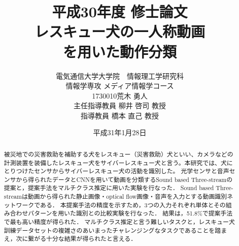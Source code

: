 \documentclass[a4j,12pt]{jreport}
\title{
	平成30年度 修士論文\vspace{1cm}\\
	\huge  レスキュー犬の一人称動画\\を用いた動作分類\vspace{6cm}
}
\author{
	電気通信大学大学院　情報理工学研究科\\
	情報学専攻 メディア情報学コース\\
	1730010\hspace{1cm}荒木 勇人\\
	主任指導教員 柳井 啓司 教授\\
        指導教員 橋本 直己 教授
}
\date{
平成31年1月28日
}
\begin{document}
\maketitle
\thispagestyle{empty}
\pagebreak

\begin{abstract}

被災地での災害救助を補助する犬をレスキュー（災害救助）犬といい、カメラなどの計測装置を装備したレスキュー犬をサイバーレスキュー犬と言う。本研究では、犬にとりつけたセンサからサイバーレスキュー犬の活動を識別した。
光学センサと音声センサから得られたデータとCNNを用いて動画を分類するSound based Three-streamの提案と，提案手法をマルチクラス推定に用いた実験を行なった．
Sound based Three-streamは動画から得られた静止画像・optical flow画像・音声を入力とする動画識別ネットワークである．
本提案手法の精度を示すため，3つの入力それぞれ単体とその組み合わせパターンを用いた識別との比較実験を行なった．
結果は，51.8\%で提案手法で最も高い精度が得られた．
マルチクラス推定と言う難しいタスクと，レスキュー犬訓練データセットの複雑さのあいまったチャレンジングなタスクであることを踏まえ，次に繋がる十分な結果が得られたと言える．


\par


\end{abstract}

\pagestyle{jgraduate}


\tableofcontents

\pagebreak

\newpage











%

\end{document}
